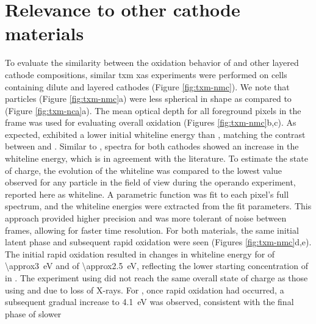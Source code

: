 \documentclass{article}
\begin{document}
\newpage %
\section{Relevance to other cathode materials}


To evaluate the similarity between the oxidation behavior of \nca{}
and other layered cathode compositions, similar \gls{txm} \gls{xas}
experiments were performed on cells containing dilute \nmc[333]{} and
\nmc[532]{} layered cathodes (Figure \ref{fig:txm-nmc}). We note that
\nmc{} particles (Figure \ref{fig:txm-nmc}a) were less spherical in
shape as compared to \nca{} (Figure \ref{fig:txm-nca}a). The mean
optical depth for all foreground pixels in the frame was used for
evaluating overall oxidation (Figures \ref{fig:txm-nmc}b,c). As
expected, \nmc[333]{} exhibited a lower initial whiteline energy than
\nca{}\cite{deb2005,muto2009}, matching the contrast between
 and . Similar to \nca{}, spectra for both
\nmc{} cathodes showed an increase in the whiteline energy, which is
in agreement with the literature\cite{deb2005}. To estimate the state
of charge, the evolution of the whiteline was compared to the lowest
value observed for any particle in the field of view during the
operando experiment, reported here as \textDelta{}whiteline. A
parametric function was fit to each pixel's full spectrum, and the
whiteline energies were extracted from the fit parameters. This
approach provided higher precision and was more tolerant of noise
between frames, allowing for faster time resolution. For both \nmc{}
materials, the same initial latent phase and subsequent rapid
oxidation were seen (Figures \ref{fig:txm-nmc}d,e). The initial rapid
 oxidation resulted in changes in whiteline energy for
\nmc[333]{} of \SI{\approx3}{\electronvolt} and \nmc[532]{} of
\SI{\approx2.5}{\electronvolt}, reflecting the lower starting
concentration of  in \nmc[333]{}. The experiment using
\nmc[532]{} did not reach the same overall state of charge as those
using \nmc[333]{} and \nca{} due to loss of X-rays. For \nmc[333]{},
once rapid oxidation had occurred, a subsequent gradual increase to
\SI{4.1}{eV} was observed, consistent with the final phase of slower
\end{document}
